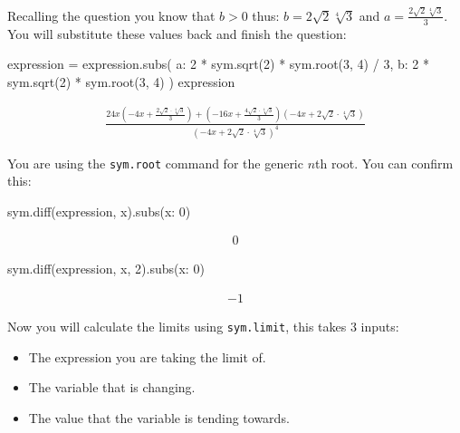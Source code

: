 Recalling the question you know that \(b>0\) thus: \(b = 2\sqrt{2}\sqrt[4]{3}\) and
\(a=\frac{2\sqrt{2}\sqrt[4]{3}}{3}\).
You will substitute these values back and finish the question:


\begin{pyin}
expression = expression.subs(
    {a: 2 * sym.sqrt(2) * sym.root(3, 4) / 3, b: 2 * sym.sqrt(2) * sym.root(3, 4)}
)
expression
\end{pyin}




\begin{equation*}
\begin{split}\displaystyle \frac{24 x \left(- 4 x + \frac{2 \sqrt{2} \cdot \sqrt[4]{3}}{3}\right) + \left(- 16 x + \frac{4 \sqrt{2} \cdot \sqrt[4]{3}}{3}\right) \left(- 4 x + 2 \sqrt{2} \cdot \sqrt[4]{3}\right)}{\left(- 4 x + 2 \sqrt{2} \cdot \sqrt[4]{3}\right)^{4}}\end{split}
\end{equation*}

You are using the \texttt{sym.root} command for the generic \(n\)th root.
You can confirm this:




\begin{pyin}
sym.diff(expression, x).subs({x: 0})
\end{pyin}




\begin{equation*}
\begin{split}\displaystyle 0\end{split}
\end{equation*}






\begin{pyin}
sym.diff(expression, x, 2).subs({x: 0})
\end{pyin}




\begin{equation*}
\begin{split}\displaystyle -1\end{split}
\end{equation*}




Now you will calculate the limits using \texttt{sym.limit}, this takes 3 inputs:
\begin{itemize}
\item 

The expression you are taking the limit of.

\item 

The variable that is changing.

\item 

The value that the variable is tending towards.

\end{itemize}





